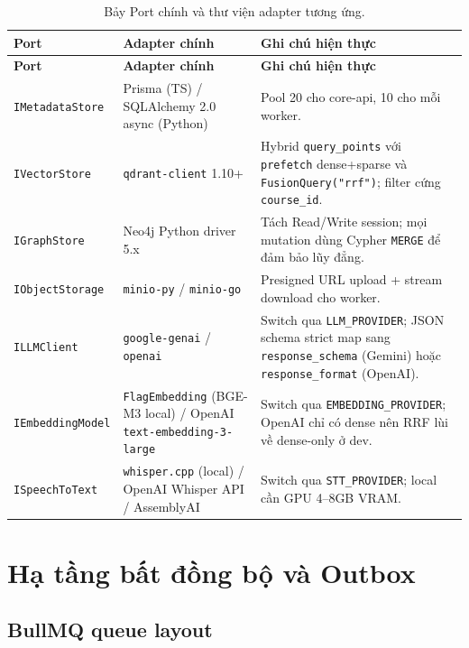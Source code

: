 \begin{longtable}{|p{3.3cm}|p{4cm}|p{6.2cm}|}
\caption{Bảy Port chính và thư viện adapter tương ứng.}
\label{tab:adapter-overview} \\
\hline
\textbf{Port} & \textbf{Adapter chính} & \textbf{Ghi chú hiện thực} \\
\hline
\endfirsthead
\hline
\textbf{Port} & \textbf{Adapter chính} & \textbf{Ghi chú hiện thực} \\
\hline
\endhead

\texttt{IMetadataStore}
    & Prisma (TS) / SQLAlchemy 2.0 async (Python)
    & Pool 20 cho core-api, 10 cho mỗi worker. \\
\hline
\texttt{IVectorStore}
    & \texttt{qdrant-client} 1.10+
    & Hybrid \texttt{query\_points} với \texttt{prefetch} dense+sparse
      và \texttt{FusionQuery("rrf")}; filter cứng \texttt{course\_id}. \\
\hline
\texttt{IGraphStore}
    & Neo4j Python driver 5.x
    & Tách Read/Write session; mọi mutation dùng
      Cypher \texttt{MERGE} để đảm bảo lũy đẳng. \\
\hline
\texttt{IObjectStorage}
    & \texttt{minio-py} / \texttt{minio-go}
    & Presigned URL upload + stream download cho worker. \\
\hline
\texttt{ILLMClient}
    & \texttt{google-genai} / \texttt{openai}
    & Switch qua \texttt{LLM\_PROVIDER}; JSON schema strict map sang
      \texttt{response\_schema} (Gemini) hoặc
      \texttt{response\_format} (OpenAI). \\
\hline
\texttt{IEmbeddingModel}
    & \texttt{FlagEmbedding} (BGE-M3 local) / OpenAI
      \texttt{text-embedding-3-large}
    & Switch qua \texttt{EMBEDDING\_PROVIDER}; OpenAI chỉ có dense
      nên RRF lùi về dense-only ở dev. \\
\hline
\texttt{ISpeechToText}
    & \texttt{whisper.cpp} (local) / OpenAI Whisper API /
      AssemblyAI
    & Switch qua \texttt{STT\_PROVIDER}; local cần GPU 4--8GB VRAM. \\
\hline
\end{longtable}

\section{Hạ tầng bất đồng bộ và Outbox}
\label{sec:async-impl}

\subsection{BullMQ queue layout}

